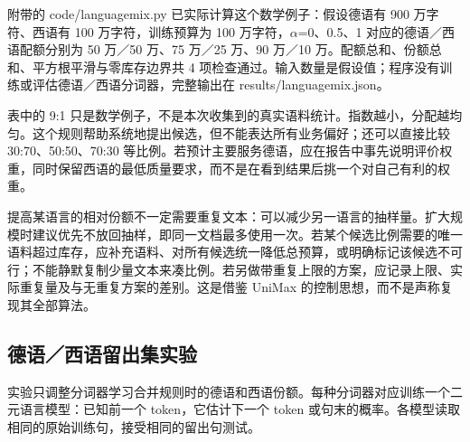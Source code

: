 \documentclass[11pt,a4paper]{article}
\newcommand{\BpeDocCodeInline}[1]{{\ttfamily #1}}
\newcommand{\BpeDocSubsection}[2]{\subsection{\texorpdfstring{#1}{#2}}}
\begin{document}
附带的 \BpeDocCodeInline{code/\allowbreak{}language\relax\allowbreak{}mix.\allowbreak{}py} 已实际计算这个数学例子：假设德语有 900 万字符、西语有 100 万字符，训练预算为 100 万字符，\(\alpha\)=0、0.5、1 对应的德语／西语配额分别为 50 万／50 万、75 万／25 万、90 万／10 万。配额总和、份额总和、平方根平滑与零库存边界共 4 项检查通过。输入数量是假设值；程序没有训练或评估德语／西语分词器，完整输出在 \BpeDocCodeInline{results/\allowbreak{}language\relax\allowbreak{}mix.\allowbreak{}json}。


表中的 9:1 只是数学例子，不是本次收集到的真实语料统计。指数越小，分配越均匀。这个规则帮助系统地提出候选，但不能表达所有业务偏好；还可以直接比较 30:70、50:50、70:30 等比例。若预计主要服务德语，应在报告中事先说明评价权重，同时保留西语的最低质量要求，而不是在看到结果后挑一个对自己有利的权重。


提高某语言的相对份额不一定需要重复文本：可以减少另一语言的抽样量。扩大规模时建议优先不放回抽样，即同一文档最多使用一次。若某个候选比例需要的唯一语料超过库存，应补充语料、对所有候选统一降低总预算，或明确标记该候选不可行；不能静默复制少量文本来凑比例。若另做带重复上限的方案，应记录上限、实际重复量及与无重复方案的差别。这是借鉴 UniMax 的控制思想，而不是声称复现其全部算法。


\BpeDocSubsection{德语／西语留出集实验}{德语／西语留出集实验}


实验只调整分词器学习合并规则时的德语和西语份额。每种分词器对应训练一个二元语言模型：已知前一个 \BpeDocCodeInline{token}，它估计下一个 \BpeDocCodeInline{token} 或句末的概率。各模型读取相同的原始训练句，接受相同的留出句测试。
\end{document}
